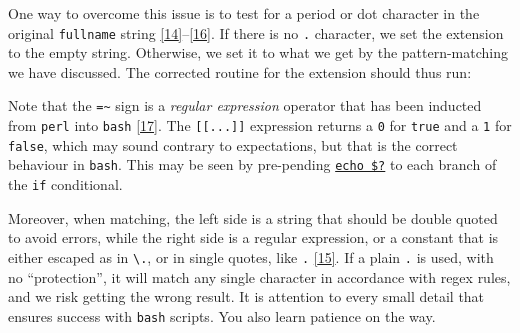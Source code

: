 \documentclass[
  a4paper,
]{article}
\newenvironment{Shaded}{\begin{snugshade}}{\end{snugshade}}
\newcommand{\AttributeTok}[1]{\textcolor[rgb]{0.80,0.80,0.80}{#1}}
\newcommand{\BuiltInTok}[1]{\textcolor[rgb]{0.80,0.80,0.80}{#1}}
\newcommand{\CommentTok}[1]{\textcolor[rgb]{0.50,0.62,0.50}{#1}}
\newcommand{\ControlFlowTok}[1]{\textcolor[rgb]{0.94,0.87,0.69}{#1}}
\newcommand{\DataTypeTok}[1]{\textcolor[rgb]{0.87,0.87,0.75}{#1}}
\newcommand{\KeywordTok}[1]{\textcolor[rgb]{0.94,0.87,0.69}{#1}}
\newcommand{\NormalTok}[1]{\textcolor[rgb]{0.80,0.80,0.80}{#1}}
\newcommand{\OperatorTok}[1]{\textcolor[rgb]{0.94,0.94,0.82}{#1}}
\newcommand{\OtherTok}[1]{\textcolor[rgb]{0.94,0.94,0.56}{#1}}
\newcommand{\PreprocessorTok}[1]{\textcolor[rgb]{1.00,0.81,0.69}{\textbf{#1}}}
\newcommand{\StringTok}[1]{\textcolor[rgb]{0.80,0.58,0.58}{#1}}
\newcommand{\VariableTok}[1]{\textcolor[rgb]{0.80,0.80,0.80}{#1}}
\begin{document}
One way to overcome this issue is to test for a period or dot character
in the original \texttt{fullname} string
\protect\hyperlink{ref-periodtest}{{[}14{]}}--\protect\hyperlink{ref-bashscriptpatmatch}{{[}16{]}}.
If there is no \texttt{.} character, we set the extension to the empty
string. Otherwise, we set it to what we get by the pattern-matching we
have discussed. The corrected routine for the extension should thus run:

\begin{Shaded}
\end{Shaded}

Note that the \texttt{=\textasciitilde{}} sign is a \emph{regular
expression} operator that has been inducted from \texttt{perl} into
\texttt{bash} \protect\hyperlink{ref-equaltilde}{{[}17{]}}. The
\texttt{{[}{[}...{]}{]}} expression returns a \texttt{0} for
\texttt{true} and a \texttt{1} for \texttt{false}, which may sound
contrary to expectations, but that is the correct behaviour in
\texttt{bash}. This may be seen by pre-pending
\href{https://stackoverflow.com/questions/6834487/what-is-the-dollar-question-mark-variable-in-shell-scripting}{\texttt{echo\ \$?}}
to each branch of the \texttt{if} conditional.

Moreover, when matching, the left side is a string that should be double
quoted to avoid errors, while the right side is a regular expression, or
a constant that is either escaped as in \texttt{\textbackslash{}.}, or
in single quotes, like \texttt{\textquotesingle{}.\textquotesingle{}}
\protect\hyperlink{ref-dottest}{{[}15{]}}. If a plain \texttt{.} is
used, with no ``protection'', it will match any single character in
accordance with regex rules, and we risk getting the wrong result. It is
attention to every small detail that ensures success with \texttt{bash}
scripts. You also learn patience on the way.  \normalfont
\end{document}
